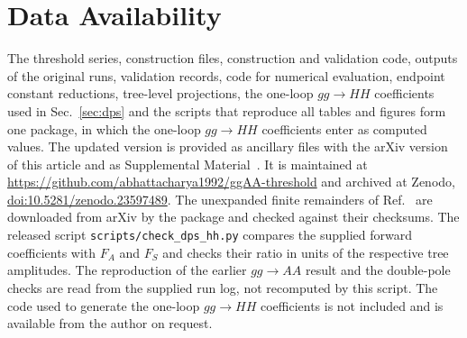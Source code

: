 \section*{Data Availability}
\label{sec:dataavailability}

The threshold series, construction files, construction and validation code,
outputs of the original runs, validation records, code for numerical evaluation, endpoint constant reductions, tree-level projections, the one-loop $gg\to HH$ coefficients used in Sec.~\ref{sec:dps} and the scripts that reproduce all tables and figures form one package, in which the one-loop $gg\to HH$ coefficients enter as computed values.
The updated version is provided as ancillary files with the arXiv version of this article and as Supplemental Material~\cite{SupplementalMaterial}.
It is maintained at \url{https://github.com/abhattacharya1992/ggAA-threshold} and archived at Zenodo, \href{https://doi.org/10.5281/zenodo.23597489}{doi:10.5281/zenodo.23597489}.
The unexpanded finite remainders of Ref.~\cite{Bhattacharya:2019bmd} are downloaded from arXiv by the package and checked against their checksums.
The released script \texttt{scripts/check\_dps\_hh.py}
compares the supplied forward coefficients with $F_A$ and
$F_S$ and checks their ratio in units of the respective tree
amplitudes.
The reproduction of the earlier $gg\to AA$ result and the
double-pole checks are read from the supplied run log, not
recomputed by this script.
The code used to generate the one-loop $gg\to HH$ coefficients is not included and is available from the author on request.
